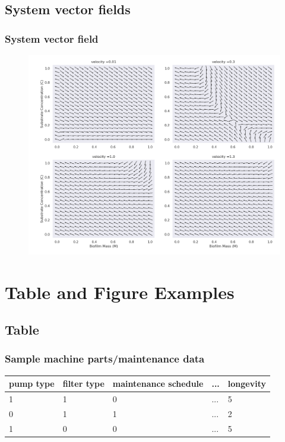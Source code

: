\documentclass[
	11pt, %
]{beamer}
\begin{document}
\subsection{System vector fields}

\begin{frame}
    \frametitle{System vector field}
	\begin{figure}
		\includegraphics[width=0.8\linewidth]{system_vector_fields.png}
	\end{figure}
\end{frame}


\section{Table and Figure Examples}

\subsection{Table}

\begin{frame}
	\frametitle{Sample machine parts/maintenance data}

	\begin{table}
		\begin{tabular}{l l l l l}
			\toprule
			pump type & filter type & maintenance schedule & ... & longevity \\
			\midrule
			1 & 1 & 0 & ... & 5 \\
			0 & 1 & 1 & ... & 2 \\
			1 & 0 & 0 & ... & 5 \\
			\bottomrule
		\end{tabular}
	\end{table}
\end{frame}
\end{document}
